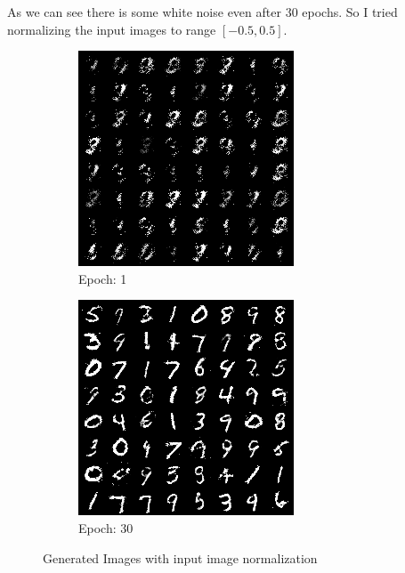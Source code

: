 \documentclass{article}
\begin{document}
As we can see there is some white noise even after 30 epochs. So I tried normalizing the input images to range $[-0.5,0.5]$.

\begin{figure}[H]
     \centering
     \begin{subfigure}[b]{0.49\textwidth}
         \centering
         \includegraphics[width=\textwidth]{images/epoch11.png}
         \caption{Epoch: 1}
     \end{subfigure}
     \hfill
     \begin{subfigure}[b]{0.49\textwidth}
         \centering
         \includegraphics[width=\textwidth]{images/epoch130.png}
         \caption{Epoch: 30}
     \end{subfigure}
        \caption{Generated Images with input image normalization}
\end{figure}
\end{document}
